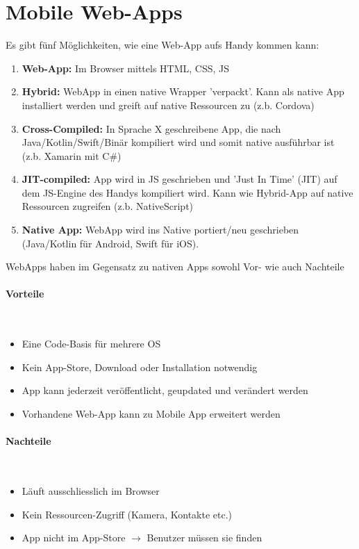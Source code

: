 \documentclass[a4paper, 11pt]{article}
\begin{document}
\newpage

\section{Mobile Web-Apps}
Es gibt fünf Möglichkeiten, wie eine Web-App aufs Handy kommen kann:

\begin{enumerate}
	\item \textbf{Web-App: } Im Browser mittels HTML, CSS, JS
	\item \textbf{Hybrid:} WebApp in einen native Wrapper 'verpackt'. Kann als native App installiert werden und greift auf native Ressourcen zu (z.b. Cordova)
	\item \textbf{Cross-Compiled:} In Sprache X geschreibene App, die nach Java/Kotlin/Swift/Binär kompiliert wird und somit native ausführbar ist (z.b. Xamarin mit C\#)
	\item \textbf{JIT-compiled:} App wird in JS geschrieben und 'Just In Time' (JIT) auf dem JS-Engine des Handys kompiliert wird. Kann wie Hybrid-App auf native Ressourcen zugreifen (z.b. NativeScript)
	\item \textbf{Native App:} WebApp wird ins Native portiert/neu geschrieben (Java/Kotlin für Android, Swift für iOS).
\end{enumerate}

\noindent WebApps haben im Gegensatz zu nativen Apps sowohl Vor- wie auch Nachteile

\begin{multicols}{2}
	\paragraph{Vorteile}\mbox{}\\
	\begin{itemize}
		\item Eine Code-Basis für mehrere OS
		\item Kein App-Store, Download oder Installation notwendig
		\item App kann jederzeit veröffentlicht, geupdated und verändert werden
		\item Vorhandene Web-App kann zu Mobile App erweitert werden
	\end{itemize}
\columnbreak
	\paragraph{Nachteile}\mbox{}\\
	\begin{itemize}
		\item Läuft ausschliesslich im Browser
		\item Kein Ressourcen-Zugriff (Kamera, Kontakte etc.)
		\item App nicht im App-Store $\rightarrow$ Benutzer müssen sie finden
	\end{itemize}
\end{multicols}
\end{document}
